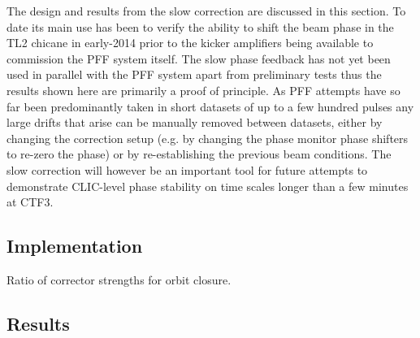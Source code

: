 The design and results from the slow correction are discussed in this section. To date its main use has been to verify the ability to shift the beam phase in the TL2 chicane in early-2014 prior to the kicker amplifiers being available to commission the PFF system itself. The slow phase feedback has not yet been used in parallel with the PFF system apart from preliminary tests thus the results shown here are primarily a proof of principle. As PFF attempts have so far been predominantly taken in short datasets of up to a few hundred pulses any large drifts that arise can be manually removed between datasets, either by changing the correction setup (e.g. by changing the phase monitor phase shifters to re-zero the phase) or by re-establishing the previous beam conditions. The slow correction will however be an important tool for future attempts to demonstrate CLIC-level phase stability on time scales longer than a few minutes at CTF3.

\subsection{Implementation}
\label{ss:slowCorrMethod}

Ratio of corrector strengths for orbit closure.

\subsection{Results}
\label{ss:slowCorrResults}
